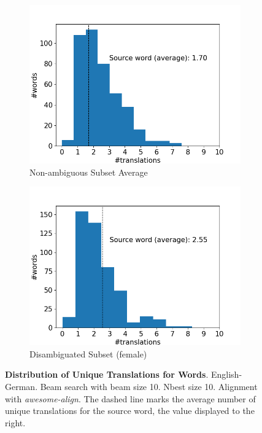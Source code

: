 \begin{figure}[!htb]
\begin{subfigure}{0.49\textwidth}
         \label{fig:alignment_translation_male}
     \end{subfigure}
     \begin{subfigure}{0.49\textwidth}
         \centering
         \includegraphics[width=\textwidth]{figures/alignment/word_translations_average.png}
         \caption{Non-ambiguous Subset Average}
         \label{fig:alignment_translation_common}
     \end{subfigure}
     \hfill
     \begin{subfigure}{0.49\textwidth}
         \centering
         \includegraphics[width=\textwidth]{figures/alignment/word_translations_female.png}
         \caption{Disambiguated Subset (female)}
         \label{fig:alignment_translation_female}
     \end{subfigure}
        \caption{\textbf{Distribution of Unique Translations for Words}. English-German. Beam search with beam size 10. Nbest size 10. Alignment with \textit{awesome-align}. The dashed line marks the average number of unique translations for the source word, the value displayed to the right.}
        \label{fig:alignment_graphs_translation_10}

\end{figure}


